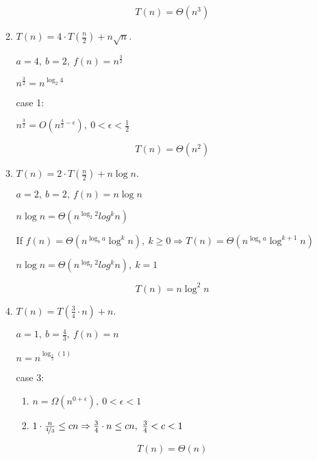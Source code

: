 \documentclass[11pt]{article}
\begin{document}
\begin{enumerate}
\begin{enumerate}
\[\boxed{T(n) = \Theta\left(n^3 \right)}\]

\item
$T(n)=4\cdot T(\frac{n}{2})+n\sqrt{n}$.

$a=4,\ b=2,\ f(n)=n^{\frac{3}{2}}$

$n^{\frac{3}{2}} = n^{\log_2 4}$

case 1:

$n^{\frac{3}{2}} = O\left(n^{\frac{4}{2}-\epsilon}\right),\ 0 < \epsilon < \frac{1}{2}$

\[\boxed{T(n) = \Theta\left(n^2 \right)}\]


\item
$T(n)=2\cdot T(\frac{n}{2})+n\log n$.

$a=2,\ b=2,\ f(n)=n\log n$

$n\log n = \Theta(n^{\log_2 2} log^k n)$

If $f(n)=\Theta (n^{\log_{b}a}\log^{k}n),\ k \geq 0 \Rightarrow T(n)=\Theta (n^{\log_{b}a}\log^{k+1}n)$

$n\log n = \Theta(n^{\log_2 2} log^k n),\ k=1$

\[\boxed{T(n)=n\log^2 n}\]

%
%
%
%
%
%
%
%

\item
$T(n)=T(\frac{3}{4}\cdot n)+n$.

$a=1,\ b=\frac{4}{3},\ f(n) = n$

$n = n^{\log_{\frac{4}{3}}(1)}$

case 3:

\begin{enumerate}
  \item
    $n = \Omega(n^{0+\epsilon}),\ 0 < \epsilon < 1$

  \item
    $1\cdot \frac{n}{\nicefrac{4}{3}} \leq cn \Rightarrow \frac{3}{4}\cdot n \leq cn,\ \frac{3}{4} < c < 1$

\end{enumerate}

\[\boxed{T(n)=\Theta(n)}\]


\end{enumerate}
\end{enumerate}
\end{document}
